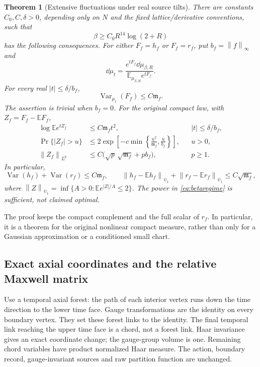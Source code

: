 \documentclass[11pt,letterpaper]{article}
\numberwithin{equation}{section}
\newtheorem{theorem}{Theorem}[section]
\theoremstyle{definition}\newtheorem{definition}[theorem]{Definition}
\theoremstyle{remark}\newtheorem{remark}[theorem]{Remark}
\newcommand{\E}{\mathbb E}\newcommand{\Var}{\operatorname{Var}}
\newcommand{\mf}{\mathfrak m_f}\newcommand{\eps}{\varepsilon}
\newcommand{\norm}[1]{\left\lVert #1\right\rVert}
\begin{document}
\begin{theorem}[Extensive fluctuations under real source tilts]
\label{thm:block}
There are constants $C_0,C,\delta>0$, depending only on $N$ and the fixed lattice/derivative conventions, such that
\begin{equation}
 \beta\ge C_0R^{14}\log(2+R)
 \label{eq:betaregime}
\end{equation}
has the following consequences. For either $F_f=h_f$ or $F_f=r_f$, put $b_f=\norm f_\infty$ and
\[
 \dd\mu_t=\frac{e^{tF_f}\dd\mu_{\beta,R}}{\E_{\mu_{\beta,R}}e^{tF_f}}.
\]
For every real $|t|\le\delta/b_f$,
\begin{equation}
 \Var_{\mu_t}(F_f)\le C\mf.
 \label{eq:tiltedvariance}
\end{equation}
The assertion is trivial when $b_f=0$. For the original compact law, with $Z_f=F_f-\E F_f$,
\begin{align}
 \log\E e^{tZ_f}&\le C\mf t^2,
 && |t|\le\delta/b_f,\label{eq:CGF}\\
 \Pr\{|Z_f|>u\}&\le2\exp\left[-c\min\left\{
                 \frac{u^2}{\mf},\frac{u}{b_f}\right\}\right],
 &&u>0,\label{eq:Bernstein}\\
 \norm{Z_f}_{L^p}&\le C\bigl(\sqrt p\,\sqrt{\mf}+p b_f\bigr),
 &&p\ge1.\label{eq:moments}
\end{align}
In particular,
\begin{equation}
 \Var(h_f)+\Var(r_f)\le C\mf,\qquad
 \norm{h_f-\E h_f}_{\psi_1}+\norm{r_f-\E r_f}_{\psi_1}
 \le C\sqrt{\mf},
 \label{eq:extensive}
\end{equation}
where $\norm Z_{\psi_1}=\inf\{A>0:\E e^{|Z|/A}\le2\}$. The power in \eqref{eq:betaregime} is sufficient, not claimed optimal.
\end{theorem}

The proof keeps the compact complement and the full scalar of $r_f$. In particular, it is a theorem for the original nonlinear compact measure, rather than only for a Gaussian approximation or a conditioned small chart.

\subsection{Exact axial coordinates and the relative Maxwell matrix}

Use a temporal axial forest: the path of each interior vertex runs down the time direction to the lower time face. Gauge transformations are the identity on every boundary vertex. They set these forest links to the identity. The final temporal link reaching the upper time face is a chord, not a forest link. Haar invariance gives an exact coordinate change; the gauge-group volume is one. Remaining chord variables have product normalized Haar measure. The action, boundary record, gauge-invariant sources and raw partition function are unchanged.
\end{document}
